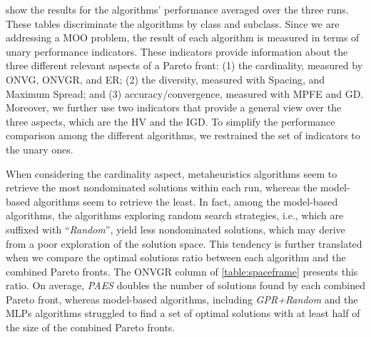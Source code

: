  show the results for the algorithms' performance averaged over the three runs. These tables discriminate the algorithms by class and subclass. Since we are addressing a \ac{MOO} problem, the result of each algorithm is measured in terms of unary performance indicators. These indicators provide information about the three different relevant aspects of a Pareto front: (1) the cardinality, measured by \ac{ONVG}, \ac{ONVGR}, and \ac{ER}; (2) the diversity, measured with Spacing, and Maximum Spread; and (3) accuracy/convergence, measured with \ac{MPFE} and \ac{GD}. Moreover, we further use two indicators that provide a general view over the three aspects, which are the \ac{HV} and the \ac{IGD}. To simplify the performance comparison among the different algorithms, we restrained the set of indicators to the unary ones. 

When considering the cardinality aspect, metaheuristics algorithms seem to retrieve the most nondominated solutions within each run, whereas the model-based algorithms seem to retrieve the least. In fact, among the model-based algorithms, the algorithms exploring random search strategies, i.e., which are suffixed with ``\textit{Random}'', yield less nondominated solutions, which may derive from a poor exploration of the solution space. This tendency is further translated when we compare the optimal solutions ratio between each algorithm and the combined Pareto fronts. The \ac{ONVGR} column of \cref{table:spaceframe} presents this ratio. On average, \textit{PAES} doubles the number of solutions found by each combined Pareto front, whereas model-based algorithms, including \textit{GPR+Random} and the \acp{MLP} algorithms struggled to find a set of optimal solutions with at least half of the size of the combined Pareto fronts. 

